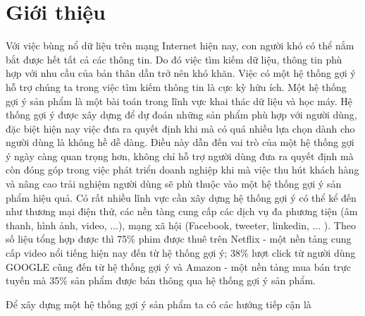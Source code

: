 \chapter{Giới thiệu}
\label{Chapter1}






Với việc bùng nổ dữ liệu trên mạng Internet hiện nay, con người khó có thể nắm bắt được hết tất cả các thông tin.
Do đó việc tìm kiếm dữ liệu, thông tin phù hợp với nhu cầu của bản thân dần trở nên khó khăn.
Việc có một hệ thống gợi ý hỗ trợ chúng ta trong việc tìm kiếm thông tin là cực kỳ hữu ích. 
Một hệ thống gợi ý sản phẩm là một bài toán trong lĩnh vực khai thác dữ liệu và học máy. 
Hệ thống gợi ý được xây dựng để dự đoán những sản phẩm phù hợp với người dùng, đặc biệt hiện nay việc đưa ra quyết định khi mà có quá nhiều lựa chọn dành cho người dùng là không hề dễ dàng. 
Điều này dẫn đến vai trò của một hệ thống gợi ý ngày càng quan trọng hơn, không chỉ hỗ trợ người dùng đưa ra quyết định mà còn đóng góp trong việc phát triển doanh nghiệp khi mà việc thu hút khách hàng và nâng cao trải nghiệm người dùng sẽ phù thuộc vào một hệ thống gợi ý sản phẩm hiệu quả. 
Có rất nhiều lĩnh vực cần xây dựng hệ thống gợi ý có thể kể đến như thương mại điện thử, các nền tàng cung cấp các dịch vụ đa phương tiện (âm thanh, hình ảnh, video, ...), mạng xã hội (Facebook, tweeter, linkedin, ... ).  
Theo số liệu tổng hợp được thì 75\% phim được thuê trên Netflix - một nền tảng cung cấp video nổi tiếng hiện nay đến từ hệ thống gợi ý; 38\% lượt click từ người dùng GOOGLE cũng đến từ hệ thống gợi ý và Amazon - một nền tảng mua bán trực tuyến mà 35\% sản phẩm được bán thông qua hệ thống gợi ý sản phẩm. 

Để xây dựng một hệ thống gợi ý sản phẩm ta có các hướng tiếp cận là 
